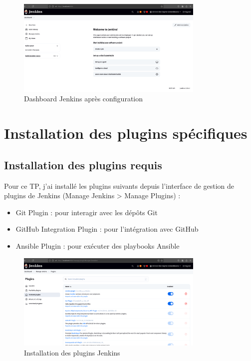 \documentclass{article}
\begin{document}
\begin{figure}[h]
    \centering
    \includegraphics[width=0.8\textwidth]{images/jenkins_dashboard.png}
    \caption{Dashboard Jenkins après configuration}
    \label{fig:jenkins_dashboard}
\end{figure}

\section{Installation des plugins spécifiques}
\subsection{Installation des plugins requis}
Pour ce TP, j'ai installé les plugins suivants depuis l'interface de gestion de plugins de Jenkins (Manage Jenkins > Manage Plugins) :
\begin{itemize}
    \item Git Plugin : pour interagir avec les dépôts Git
    \item GitHub Integration Plugin : pour l'intégration avec GitHub
    \item Ansible Plugin : pour exécuter des playbooks Ansible
\end{itemize}

\begin{figure}[h]
    \centering
    \includegraphics[width=0.8\textwidth]{images/jenkins_plugins.png}
    \caption{Installation des plugins Jenkins}
    \label{fig:jenkins_plugins}
\end{figure}
\end{document}
